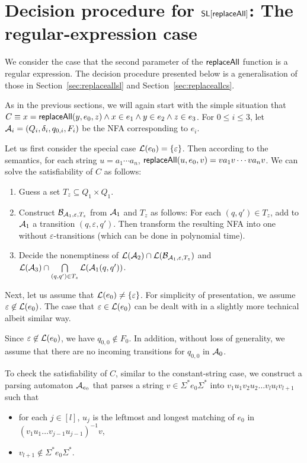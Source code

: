 
\section{Decision procedure for $\mathsf{SL}[\mathsf{replaceAll}]$: The regular-expression case} \label{sec:replaceallre}

We consider the case that the second parameter of the $\mathsf{replaceAll}$ function is a regular expression.  The decision procedure presented below is a generalisation of those in Section~\ref{sec:replaceallsl} and Section~\ref{sec:replaceallcs}.

As in the previous sections, we will again start with the simple situation that $C \equiv x = \mathsf{replaceAll}(y, e_0, z) \wedge x \in e_1 \wedge y \in e_2 \wedge z \in e_3$. For $0\leq i\leq 3$, let $\mathcal{A}_i = (Q_i, \delta_i, q_{0,i}, F_i)$ be the NFA corresponding to $e_i$.

Let us first consider the special case $\mathcal{L}(e_0)= \{\varepsilon\}$. Then according to the semantics, for each string $u = a_1 \cdots a_n$, $\mathsf{replaceAll}(u, e_0, v) = v a_1 v \cdots v a_n v$. We  can solve the satisfiability of $C$ as follows:
\begin{enumerate}
\item Guess a set $T_z \subseteq Q_1 \times Q_1$.
%
\item Construct $\mathcal{B}_{\mathcal{A}_1, \varepsilon, T_z}$ from $\mathcal{A}_1$ and $T_z$ as follows: For each $(q,q') \in T_z$, add to $\mathcal{A}_1$ a transition $(q, \varepsilon, q')$. Then transform the resulting NFA into one without $\varepsilon$-transitions (which can be done in polynomial time).
%
\item  Decide the nonemptiness of $\mathcal{L}(\mathcal{A}_2) \cap \mathcal{L}(\mathcal{B}_{\mathcal{A}_1, \varepsilon, T_z})$ and $\mathcal{L}(\mathcal{A}_3) \cap \bigcap \limits_{(q,q') \in T_z} \mathcal{L}(\mathcal{A}_1(q,q'))$.
\end{enumerate}

Next, let us assume that $\mathcal{L}(e_0) \neq \{\varepsilon\}$. For simplicity of presentation,
we assume $\varepsilon \not \in \mathcal{L}(e_0)$. The case that $\varepsilon \in \mathcal{L}(e_0)$ can be dealt with in a slightly more technical albeit similar way.

Since $\varepsilon \not \in \mathcal{L}(e_0)$, we have $q_{0,0} \not \in F_0$. In addition, without loss of generality, we assume that there are no incoming transitions for $q_{0,0}$ in $\mathcal{A}_0$.

To check the satisfiability of $C$, similar to the constant-string case, we construct a parsing automaton $\mathcal{A}_{e_0}$ that parses a string $v \in \Sigma^\ast e_0 \Sigma^\ast$ into $v_1 u_1 v_2 u_2 \dots v_l u_l v_{l+1}$ such that
\begin{itemize}
	\item for each $j \in [l]$, $u_j$ is the leftmost and longest matching of $e_0$ in $(v_1 u_1 \dots v_{j-1} u_{j-1})^{-1} v$,
	\item $v_{l+1} \not \in \Sigma^\ast e_0 \Sigma^\ast$.
\end{itemize}


